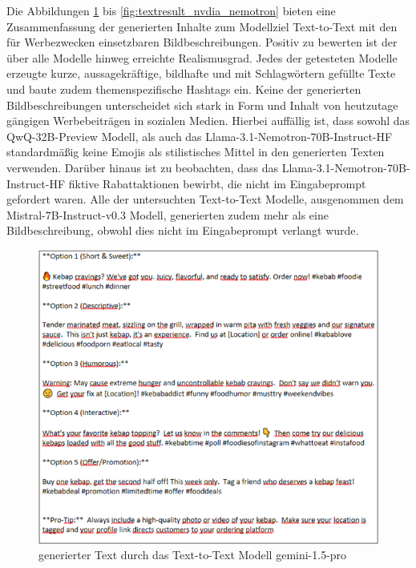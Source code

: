 Die Abbildungen \ref{fig:textresult_gemini} bis \ref{fig:textresult_nvdia_nemotron} bieten eine Zusammenfassung der generierten Inhalte zum Modellziel Text-to-Text mit den für Werbezwecken einsetzbaren Bildbeschreibungen.
Positiv zu bewerten ist der über alle Modelle hinweg erreichte Realismusgrad.
Jedes der getesteten Modelle erzeugte kurze, aussagekräftige, bildhafte und mit Schlagwörtern gefüllte Texte und baute zudem themenspezifische Hashtags ein.
Keine der generierten Bildbeschreibungen unterscheidet sich stark in Form und Inhalt von heutzutage gängigen Werbebeiträgen in sozialen Medien.
Hierbei auffällig ist, dass sowohl das QwQ-32B-Preview Modell, als auch das Llama-3.1-Nemotron-70B-Instruct-HF standardmäßig keine Emojis als stilistisches Mittel in den generierten Texten verwenden.
Darüber hinaus ist zu beobachten, dass das Llama-3.1-Nemotron-70B-Instruct-HF fiktive Rabattaktionen bewirbt, die nicht im Eingabeprompt gefordert waren.
Alle der untersuchten Text-to-Text Modelle, ausgenommen dem Mistral-7B-Instruct-v0.3 Modell, generierten zudem mehr als eine Bildbeschreibung, obwohl dies nicht im Eingabeprompt verlangt wurde.

\clearpage

\begin{figure}[htbp]
    \centering
    \includegraphics[width=\textwidth]{abbildungen/textresult_gemini}
    \caption{generierter Text durch das Text-to-Text Modell gemini-1.5-pro}
    \label{fig:textresult_gemini}
\end{figure}

